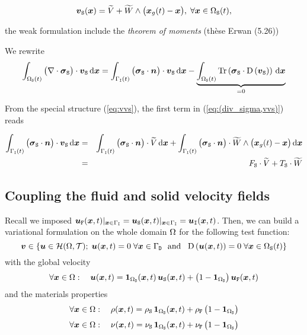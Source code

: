 \documentclass[10pt,a4paper]{article}
\begin{document}
\begin{equation}
\label{eq:vvs}
\vvs(\vx)= \tilde V + \tilde{W}\wedge \big(\vxg(t) - \vx\big),\; \forall \vx \in \doms(t),
\end{equation}

the weak formulation include the \emph{theorem of moments} (\cf thèse Erwan (5.26))

We rewrite
\begin{equation}
\label{eq:(div_sigma,vvs)}
\int_{\doms(t)} \big(\div \vsigmas\big) \cdot \vvs \, \d \vx = \int_{\boui(t)} \big(\vsigmas\cdot \vec n\big) \cdot \vvs \, \d \vx-\underbrace{\int_{\doms(t)} \trace{\vsigmas\cdot \D{\vvs}}\, \d \vx }_{=0}
\end{equation}

From the special structure (\ref{eq:vvs}), the first term in (\ref{eq:(div_sigma,vvs)}) reads

\begin{eqnarray}
\int_{\boui(t)} \big(\vsigmas\cdot \vec n\big) \cdot \vvs \, \d \vx &=& 
\int_{\boui(t)} \big(\vsigmas\cdot \vec n\big) \cdot \tilde V \, \d \vx+\int_{\boui(t)} \big(\vsigmas\cdot \vec n\big) \cdot \tilde{W}\wedge \big(\vxg(t) - \vx\big) \, \d \vx \nonumber\\
&=& F_\labs\cdot\tilde{V} + T_\labs \cdot \tilde{W}
\end{eqnarray}

\subsection{Coupling the fluid and solid velocity fields}
Recall we imposed $\vuf(\vx, t)\vert_{\vx \in\boui}=\vus(\vx, t)\vert_{\vx \in\boui}=\vui(\vx, t)$. Then, we can build a variational formulation on the whole domain $\dom$ for the following test function:
$$\vv \in \left\{\vu \in \sH(\dom, \sT);\; \vu(\vx, t) = 0 \; \forall \vx \in \boud \mbox{~~and~~} \D{\vu(\vx, t)} = 0\; \forall \vx \in \doms(t) \right\} $$
with the global velocity 
$$\forall \vx \in \Omega: \quad \vu(\vx, t) = \ind{\doms}(\vx, t)\, \vus(\vx, t) + \big(1-\ind \doms \big)\,\vuf(\vx, t)$$
and the materials properties
$$\forall \vx \in \Omega: \quad \rho(\vx, t) = \rhos\,\ind{\doms}(\vx, t) + \rhof\,\big(1-\ind \doms \big)$$
$$\forall \vx \in \Omega: \quad \nu(\vx, t) = \nus\,\ind{\doms}(\vx, t) + \nuf\,\big(1-\ind \doms \big)$$
\end{document}
